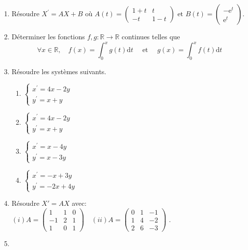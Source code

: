 \documentclass[12pt,a4paper]{article}
\begin{document}
\begin{enumerate}
\item
Résoudre  $X^{\prime}=A X+B$ où
$
A(t)=\left(\begin{array}{cc}
	1+t & t \\
	-t & 1-t
\end{array}\right)  \text { et }  B(t)=\left(\begin{array}{c}
	-\mathrm{e}^{t} \\
	\mathrm{e}^{t}
\end{array}\right)
$.
\item Déterminer les fonctions $f, g: \mathbb{R} \rightarrow \mathbb{R}$ continues telles que
$$
\forall x \in \mathbb{R}, \quad f(x)=\int_{0}^{x} g(t) \mathrm{d} t \quad \text { et } \quad g(x)=\int_{0}^{x} f(t) \mathrm{d} t
$$

\item

Résoudre les systèmes suivants.
\begin{multicols}{3}
\begin{enumerate}
	\item
	$\left\{\begin{array}{l}
		x^{\prime}=4 x-2 y \\
		y^{\prime}=x+y
	\end{array} \quad\right.$
	\item
	$\left\{\begin{array}{l}
		x^{\prime}=4 x-2 y \\
		y^{\prime}=x+y
	\end{array} \quad\right.$
	\item
	$\left\{\begin{array}{l}
	x^{\prime}=x-4 y \\
	y^{\prime}=x-3 y
\end{array} \quad\right.$
	\item
	$\left\{\begin{array}{l}
		x^{\prime}=-x+3 y \\
		y^{\prime}=-2 x+4 y
	\end{array}\right.$
\end{enumerate}
\end{multicols}
\item Résoudre $X'=AX$ avec:
$
(i) A=\left(\begin{array}{ccc}
	1 & 1 & 0 \\
	-1 & 2 & 1 \\
	1 & 0 & 1
\end{array}\right)\quad(ii) A=\left(\begin{array}{ccc}
	0 & 1 & -1 \\
	1 & 4 & -2 \\
	2 & 6 & -3
\end{array}\right) \text { . }
$
\item


\end{enumerate}
\end{document}
